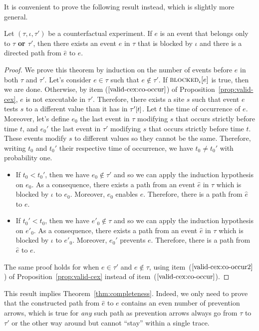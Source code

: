 It is convenient to prove the following result instead, which is
slightly more general.

\smallskip

\begin{theorem*} Let $(\tau, \iota, \tau')$ be a counterfactual
  experiment. If $e$ is an event that belongs only to $\tau$
  \textbf{or $\tau'$}, then there exists an event $\hat e$ in
  $\tau$ that is blocked by $\iota$ and there is a directed path 
  from $\hat e$ to $e$.
\end{theorem*}

\begin{proof}
  We prove this theorem by induction on the number of events before
  $e$ in both $\tau$ and $\tau'$. Let's consider $e \in \tau$ such
  that $e \notin \tau'$. If ${\textsc{blocked}}_{\iota}[e]$ is true, then we are
  done. Otherwise, by item ($\ref{valid-cex:co-occur}$) of
  Proposition~\ref{prop:valid-cex}, $e$ is not executable in
  $\tau'$. Therefore, there exists a site $s$ such that event $e$
  tests $s$ to a different value than it has in $\TSTATE{t}{\tau'}$.
  Let $t$ the time of occurrence of $e$.  Moreover, let's define $e_0$
  the last event in $\tau$ modifying $s$ that occurs strictly before
  time $t$, and $e_0'$ the last event in $\tau'$ modifying $s$ that
  occurs strictly before time $t$. These events modify $s$ to
  different values so they cannot be the same. Therefore, writing
  $t_0$ and $t_0'$ their respective time of occurrence, we have
  $t_0 \neq t_0'$ with probability one.

  \begin{itemize}
  \item If $t_0 < t_0'$, then we have $e_0 \notin \tau'$
    and so we can apply the induction hypothesis on $e_0$. As a
    consequence, there exists a path from an event $\hat e$ in $\tau$
    which is blocked by $\iota$ to $e_0$. Moreover, $e_0$ enables
    $e$. Therefore, there is a path from $\hat e$ to $e$.
  \item If $t_0' < t_0$, then we have $e'_0 \notin \tau$
    and so we can apply the induction hypothesis on $e'_0$. As a
    consequence, there exists a path from an event $\hat e$ in $\tau$
    which is blocked by $\iota$ to $e'_0$. Moreover, $e_0'$ prevents
    $e$. Therefore, there is a path from $\hat e$ to $e$.
  \end{itemize}
  The same proof holds for when $e \in \tau'$ and $e \notin \tau$,
  using item~($\ref{valid-cex:co-occur2}$) of
  Proposition~\ref{prop:valid-cex} instead of
  item~($\ref{valid-cex:co-occur}$).
\end{proof}
This result implies Theorem~\ref{thm:completeness}. Indeed, we only
need to prove that the constructed path from $\hat e$ to $e$ contains
an even number of prevention arrows, which is true for \textit{any}
such path as prevention arrows always go from $\tau$ to $\tau'$ or the
other way around but cannot ``stay'' within a single trace.

